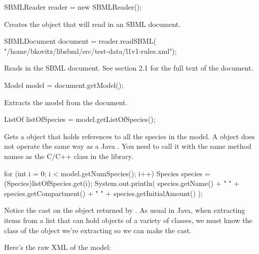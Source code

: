 \documentclass{sbmlmanual}
\begin{document}
\begin{shellVerbatim}
SBMLReader reader = new SBMLReader();
\end{shellVerbatim}

   Creates the object that will read in an SBML document.

\begin{shellVerbatim}
SBMLDocument document = reader.readSBML(
   "/home/bkovitz/libsbml/src/test-data/l1v1-rules.xml");
\end{shellVerbatim}

   Reads in the SBML document.  See section 2.1 for the
   full text of the document.

\begin{shellVerbatim}
Model model = document.getModel();
\end{shellVerbatim}

   Extracts the model from the document.

\begin{shellVerbatim}
ListOf listOfSpecies = model.getListOfSpecies();
\end{shellVerbatim}

   Gets a  object that holds references to all the
   species in the model.  A  object does not operate
   the same way as a Java .  You need to call it with
   the same method names as the C/C++  class in the
   \libsbml{} library.

\begin{shellVerbatim}
for (int i = 0; i < model.getNumSpecies(); i++) {
   Species species = (Species)listOfSpecies.get(i);
   System.out.println(
      species.getName() + "  " +
      species.getCompartment() + "  " +
      species.getInitialAmount()
   );
}
\end{shellVerbatim}

   Notice the  cast on the object returned by
   .  As usual in Java, when extracting
   items from a list that can hold objects of a variety of
   classes, we must know the class of the object we're
   extracting so we can make the cast.

   Here's the raw XML of the model:
\end{document}
